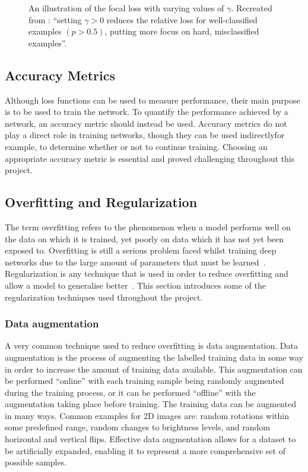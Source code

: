 \begin{figure}[t]
    \centering
    
    \caption{An illustration of the focal loss with varying values of $\gamma$. Recreated from \cite{focalloss}: ``setting $\gamma > 0$ reduces the relative loss for well-classified examples $(p > 0.5)$, putting more focus on hard, misclassified examples''.}
    \label{fig:focal}
\end{figure}

\subsection{Accuracy Metrics}

Although loss functions can be used to measure performance, their main purpose is to be used to train the network. To quantify the performance achieved by a network, an accuracy metric should instead be used. Accuracy metrics do not play a direct role in training networks, though they can be used indirectly\textemdash for example, to determine whether or not to continue training. Choosing an appropriate accuracy metric is essential and proved challenging throughout this project.


\subsection{Overfitting and Regularization}

The term overfitting refers to the phenomenon when a model performs well on the data on which it is trained, yet poorly on data which it has not yet been exposed to. Overfitting is still a serious problem faced whilst training deep networks due to the large amount of parameters that must be learned~\cite{dropout, reducing, overfitavoid}. Regularization is any technique that is used in order to reduce overfitting and allow a model to generalise better~\cite{regular}. This section introduces some of the regularization techniques used throughout the project.

\subsubsection{Data augmentation}

A very common technique used to reduce overfitting is data augmentation. Data augmentation is the process of augmenting the labelled training data in some way in order to increase the amount of training data available. This augmentation can be performed ``online'' with each training sample being randomly augmented during the training process, or it can be performed ``offline'' with the augmentation taking place before training. The training data can be augmented in many ways. Common examples for 2D images are: random rotations within some predefined range, random changes to brightness levels, and random horizontal and vertical flips. Effective data augmentation allows for a dataset to be artificially expanded, enabling it to represent a more comprehensive set of possible samples.

